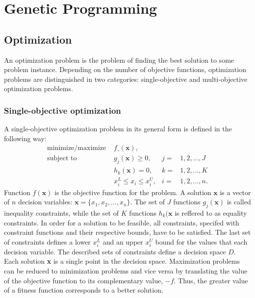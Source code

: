 \chapter{Genetic Programming}
\label{genprog}
\section{Optimization}
An optimization problem is the problem of finding the best solution to some problem instance. %
Depending on the number of objective functions, optimization problems are distinguished in two categories: single-objective and multi-objective optimization problems.

\subsection{Single-objective optimization}
A single-objective optimization problem in its general form is defined in the following way:
\begin{align*}
\label{opt_problem}
\text{minimize/maximize } & f\_(\textbf{x}),   \\
\text{subject to } & g_j(\textbf{x}) \geq 0, & j = & 1, 2, ..., J \\
           & h_k(\textbf{x}) = 0, & k = & 1, 2, ..., K \\
           & x_{i}^{L} \leq x_i \leq x_{i}^{U}, & i = & 1, 2, ..., n. 
\end{align*}
Function $f(\textbf{x})$ is the objective function for the problem.
A solution $\textbf{x}$ is a vector of $n$ decision variables: $\textbf{x} = \{x_1,x_2,...,x_n\}$.
The set of $J$ functions $g_j(\textbf{x})$ is called inequality constraints, while the set of $K$ functions $h_k(\textbf{x}$ is reffered to as equality constraints.
In order for a solution to be feasible, all constraints, specifed with constraint functions and their respective bounds, have to be satisfied.
The last set of constraints defines a lower $x_{i}^{L}$ and an upper $x_{i}^{U}$ bound for the values that each decision variable. 
The described sets of constraints define a decision space $D$.
Each solution \textbf{x} is a single point in the decision space.
Maximization problems can be reduced to minimization problems and vice versa by translating the value of the objective function to its complementary value, $-f$.
Thus, the greater value of a fitness function corresponds to a better solution.

